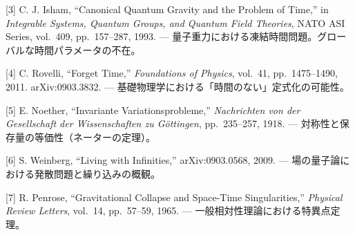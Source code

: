 \documentclass[a4paper,11pt]{ltjsarticle}
\begin{document}
{[}3{]} C. J. Isham, ``Canonical Quantum Gravity and the Problem of
Time,'' in \emph{Integrable Systems, Quantum Groups, and Quantum Field
Theories}, NATO ASI Series, vol.~409, pp.~157--287, 1993. ---
量子重力における凍結時間問題。グローバルな時間パラメータの不在。

{[}4{]} C. Rovelli, ``Forget Time,'' \emph{Foundations of Physics},
vol.~41, pp.~1475--1490, 2011. arXiv:0903.3832. ---
基礎物理学における「時間のない」定式化の可能性。

{[}5{]} E. Noether, ``Invariante Variationsprobleme,'' \emph{Nachrichten
von der Gesellschaft der Wissenschaften zu Göttingen}, pp.~235--257,
1918. --- 対称性と保存量の等価性（ネーターの定理）。

{[}6{]} S. Weinberg, ``Living with Infinities,'' arXiv:0903.0568, 2009.
--- 場の量子論における発散問題と繰り込みの概観。

{[}7{]} R. Penrose, ``Gravitational Collapse and Space-Time
Singularities,'' \emph{Physical Review Letters}, vol.~14, pp.~57--59,
1965. --- 一般相対性理論における特異点定理。
\end{document}
